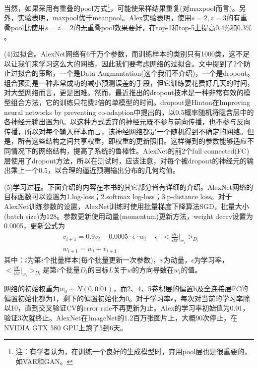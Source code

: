        当然，如果采用有重叠的pool方式\footnote{注：有学者认为，在训练一个良好的生成模型时，弃用pool层也是很重要的，如VAE和GAN。}，可能使采样结果重复(对maxpool而言)。另外，实验表明，maxpool优于meanpool。Alex实验表明，使用$s=2,z=3$的有重叠pool比使用$s=z=2$的无重叠pool效果要好，在top-1和top-5上提高$0.4\%$和$0.3\%$。
        \par
        (4)过拟合。AlexNet网络有6千万个参数，而训练样本的类别只有1000类，这不足以让我们来学习这么大的网络，因此我们要考虑网络的过拟合。文中提到了2个防止过拟合的策略，一个是Data Augmantation(这个我们不介绍)，一个是dropout。组合预测是一种非常成功的减小预测误差的手段，但它训练要花费好几天的时间，对大型网络而言，更是困难。然而，最近推出的dropout技术是一种非常有效的模型组合方法，它的训练只花费2倍的单模型的时间。dropout是Hinton在Improving neural networks by preventing co-adaption中提出的，以0.5概率随机将隐含层中的各神经元输出置为0。以这种方式丢弃的神经元既不参与前向传播，也不参与反向传播，所以对每个输入样本而言，该神经网络都是一个随机得到不确定的网络。但是，所有这些结构之间共享权重，即权重的更新照旧。这样得到的参数能够适应不同情况下的网络结构，提高了系统的鲁棒性。AlexNet的前2个full connected(FC)层使用了dropout方法，所以在测试时，应该注意，对每个被dropout的神经元的输出乘上一个0.5，以合理的逼近预测输出分布的几何均值。
        \par
        (5)学习过程。下面介绍的内容在本书的其它部分皆有详细的介绍。AlexNet网络的目标函数可以设置为1.log-loss；2.softmax log-loss；3.p-distance loss。对于AlexNet训练参数的设置，AlexNet训练时使用批量梯度下降算法SGD，批量大小(batch size)为128。参数更新使用动量(momentum)更新方法，weight deccy设置为0.0005，更新公式为
        \begin{align*}
        & v_{i+1} = 0.9v_i-0.0005\cdot\epsilon\cdot w_i - \epsilon\cdot\Big<\frac{\partial L}{\partial w}\Big |_{w_i}\Big>_{D_i}\\
        & w_{i+1} = w_i+v_{i+1}
        \end{align*}
        其中：$i$为第$i$个批量样本(每个批量更新一次参数)，$v$为动量，$\epsilon$为学习率，$\Big<\frac{\partial L}{\partial w}\Big |_{w_i}\Big>_{D_i}$是第$i$个批量$D_i$的目标$L$关于$w$的方向导数在$w_i$的值。
        \par
        网络的初始权重为$w_0\sim N(0,0.01)$，而2、4、5卷积层的偏置b及全连接层FC的偏置初始化都为1，剩下的偏置初始化为0。对于学习率$\epsilon$，每次对当前的学习率除以10，直到交叉验证CV的error rale不再更新为止。Alex的学习率初始值为0.01，验证3次就终止。AlexNet在ImageNet的1.2百万张图片上，大概90次停止，在NVIDIA GTX 580 GPU上跑了5到6天。
